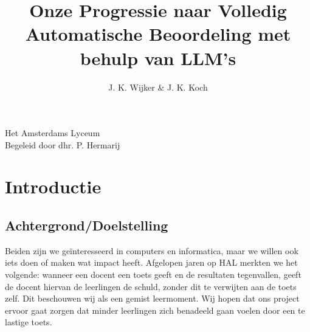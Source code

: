 \documentclass[12pt]{article}
\title{Onze Progressie naar Volledig Automatische Beoordeling met behulp van LLM's}
\author{J. K. Wijker \& J. K. Koch}
\begin{document}
\maketitle
\mbox{}
\vfill
\begin{flushright}
\large Het Amsterdams Lyceum\\
\scriptsize Begeleid door dhr. P. Hermarij \normalsize
\end{flushright}
\thispagestyle{empty}
\pagebreak

{\small\tableofcontents \normalsize}

\pagebreak
\section{Introductie}
\begin{multicols}{2}
\subsection{Achtergrond/Doelstelling} 

Beiden zijn we geïnteresseerd in computers en informatica, maar we willen ook iets doen of maken wat impact heeft. Afgelopen jaren op HAL merkten we het volgende: wanneer een docent een toets geeft en de resultaten tegenvallen, geeft de docent hiervan de leerlingen de schuld, zonder dit te verwijten aan de toets zelf. Dit beschouwen wij als een gemist leermoment. Wij hopen dat ons project ervoor gaat zorgen dat minder leerlingen zich benadeeld gaan voelen door een te lastige toets. 



\end{multicols}
\end{document}

